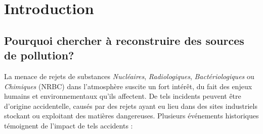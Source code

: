 \chapter{Introduction}

\section{Pourquoi chercher à reconstruire des sources de pollution?}
	La menace de rejets de substances \textit{Nucléaires}, \textit{Radiologiques}, \textit{Bactériologiques} ou \textit{Chimiques} (NRBC) dans l'atmosphère suscite un fort intérêt, du fait des enjeux humains et environnementaux qu'ils affectent. De tels incidents peuvent être d'origine accidentelle, causés par des rejets ayant eu lieu dans des sites industriels stockant ou exploitant des matières dangereuses. Plusieurs événements historiques témoignent de l'impact de tels accidents :\\
